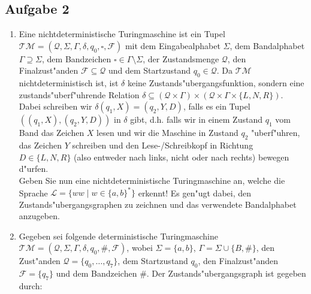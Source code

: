\documentclass[10pt,oneside,onecolumn,a4paper,german,titlepage]{article}
\begin{document}
\subsection*{Aufgabe 2}
\begin{enumerate}
\item Eine nichtdeterministische Turingmaschine ist ein Tupel $\mathcal{TM} =
(\mathcal{Q},\Sigma,\Gamma,\delta,q_0,\square,\mathcal{F})$ mit dem
Eingabealphabet $\Sigma$, dem Bandalphabet $\Gamma \supseteq \Sigma$,
dem Bandzeichen $\square \in \Gamma \setminus \Sigma$, der Zustandsmenge
$\mathcal{Q}$, den Finalzust"anden $\mathcal{F} \subseteq \mathcal{Q}$ und
dem Startzustand $q_0 \in \mathcal{Q}$. Da $\mathcal{TM}$ nichtdeterministisch
ist, ist $\delta$ keine Zustands"ubergangsfunktion, sondern eine
zustands"uberf"uhrende Relation $\delta \subseteq (\mathcal{Q} \times \Gamma)
\times (\mathcal{Q} \times \Gamma \times \{L,N,R\})$. Dabei schreiben wir
$\delta(q_1,X) = (q_2,Y,D)$, falls es ein Tupel $((q_1,X),(q_2,Y,D))$ in $\delta$
gibt, d.h. falls wir in einem Zustand $q_1$ vom Band das Zeichen $X$ lesen und
wir die Maschine in Zustand $q_2$ "uberf"uhren, das Zeichen $Y$ schreiben und den
Lese-/Schreibkopf in Richtung $D \in \{L,N,R\}$ (also entweder nach links, nicht
oder nach rechts) bewegen d"urfen.\\[4pt]
Geben Sie nun eine nichtdeterministische Turingmaschine an, welche die Sprache
$\mathcal{L} = \{ww \; | \; w \in \{a,b\}^*\}$ erkennt! Es gen"ugt dabei, den
Zustands"ubergangsgraphen zu zeichnen und das verwendete Bandalphabet anzugeben.
\item Gegeben sei folgende deterministische Turingmaschine $\mathcal{TM} =
(\mathcal{Q},\Sigma,\Gamma,\delta,q_0,\#,\mathcal{F})$, wobei $\Sigma = \{a,b\}$,
$\Gamma = \Sigma \cup \{B,\#\}$, den Zust"anden $\mathcal{Q} = \{q_0,\dots,q_7\}$,
dem Startzustand $q_0$, den Finalzust"anden $\mathcal{F} = \{q_7\}$ und dem
Bandzeichen $\#$. Der Zustands"ubergangsgraph ist gegeben durch:
\begin{center}
\end{center}
\end{enumerate}
\end{document}
